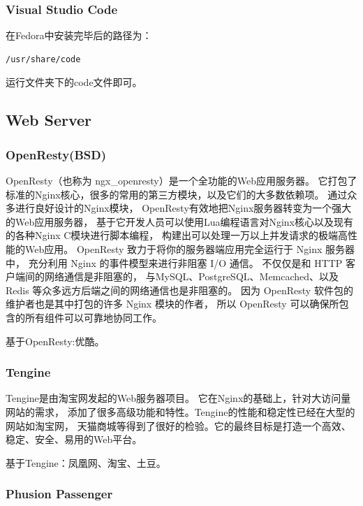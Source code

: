 \documentclass{book}
\begin{document}
\subsubsection{Visual Studio Code}

在Fedora中安装完毕后的路径为：

\begin{lstlisting}
/usr/share/code
\end{lstlisting}

运行文件夹下的code文件即可。

\subsection{Web Server}

\subsubsection{OpenResty(BSD)}

OpenResty（也称为 ngx\_openresty）是一个全功能的Web应用服务器。
它打包了标准的Nginx核心，很多的常用的第三方模块，以及它们的大多数依赖项。
通过众多进行良好设计的Nginx模块，
OpenResty有效地把Nginx服务器转变为一个强大的Web应用服务器，
基于它开发人员可以使用Lua编程语言对Nginx核心以及现有的各种Nginx C模块进行脚本编程，
构建出可以处理一万以上并发请求的极端高性能的Web应用。
OpenResty 致力于将你的服务器端应用完全运行于 Nginx 服务器中，
充分利用 Nginx 的事件模型来进行非阻塞 I/O 通信。
不仅仅是和 HTTP 客户端间的网络通信是非阻塞的，
与MySQL、PostgreSQL、Memcached、以及 Redis 等众多远方后端之间的网络通信也是非阻塞的。
因为 OpenResty 软件包的维护者也是其中打包的许多 Nginx 模块的作者，
所以 OpenResty 可以确保所包含的所有组件可以可靠地协同工作。

基于OpenResty:优酷。

\subsubsection{Tengine}

Tengine是由淘宝网发起的Web服务器项目。
它在Nginx的基础上，针对大访问量网站的需求，
添加了很多高级功能和特性。Tengine的性能和稳定性已经在大型的网站如淘宝网，
天猫商城等得到了很好的检验。它的最终目标是打造一个高效、稳定、安全、易用的Web平台。

基于Tengine：凤凰网、淘宝、土豆。

\subsubsection{Phusion Passenger}
\end{document}

